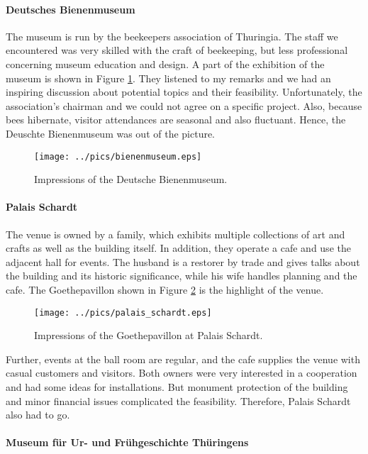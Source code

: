 \paragraph{Deutsches Bienenmuseum} 

The museum is run by the beekeepers association of Thuringia. The staff we encountered was very skilled with the craft of beekeeping, but less professional concerning museum education and design. A part of the exhibition of the museum is shown in Figure \ref{fig:bienenmuseum}. They listened to my remarks and we had an inspiring discussion about potential topics and their feasibility. Unfortunately, the association's chairman and we could not agree on a specific project. Also, because bees hibernate, visitor attendances are seasonal and also fluctuant. Hence, the Deuschte Bienenmuseum was out of the picture.
\begin{figure}[H]%
\texttt{[image: ../pics/bienenmuseum.eps]}%
\caption{Impressions of the Deutsche Bienenmuseum.}%
\label{fig:bienenmuseum} 
\end{figure}

\paragraph{Palais Schardt} 

The venue is owned by a family, which exhibits multiple collections of art and crafts as well as the building itself. In addition, they operate a cafe and use the adjacent hall for events. The husband is a restorer by trade and gives talks about the building and its historic significance, while his wife handles planning and the cafe. The Goethepavillon shown in Figure \ref{fig:schardt_pavilon} is the highlight of the venue. 
\begin{figure}[H]%
\texttt{[image: ../pics/palais\_schardt.eps]}%
\caption{Impressions of the Goethepavillon at Palais Schardt.}%
\label{fig:schardt_pavilon} %
\end{figure}
Further, events at the ball room are regular, and the cafe supplies the venue with casual customers and visitors. Both owners were very interested in a cooperation and had some ideas for installations. But monument protection of the building and minor financial issues complicated the feasibility. Therefore, Palais Schardt also had to go. 

\paragraph{Museum für Ur- und Frühgeschichte Thüringens} 

